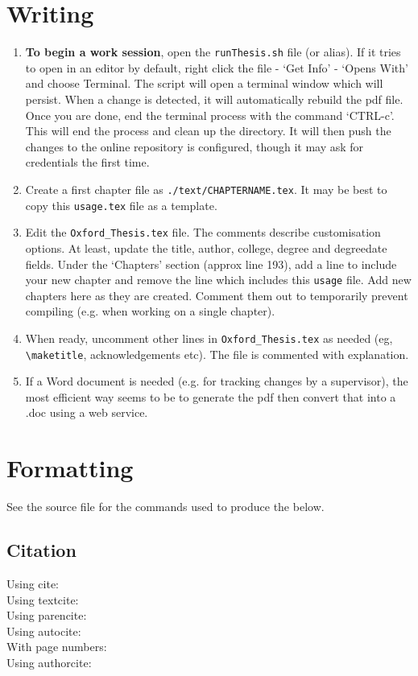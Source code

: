 \section{Writing}
\begin{enumerate}
  \item \textbf{To begin a work session}, open the \verb|runThesis.sh| file (or alias). If it tries to open in an editor by default, right click the file - `Get Info' - `Opens With' and choose Terminal. The script will open a terminal window which will persist. When a change is detected, it will automatically rebuild the pdf file. Once you are done, end the terminal process with the command `CTRL-c'. This will end the process and clean up the directory. It will then push the changes to the online repository is configured, though it may ask for credentials the first time.
  \item Create a first chapter file as \verb|./text/CHAPTERNAME.tex|. It may be best to copy this \verb|usage.tex| file as a template.
  \item Edit the \verb|Oxford_Thesis.tex| file. The comments describe customisation options. At least, update the title, author, college, degree and degreedate fields. Under the `Chapters' section (approx line 193), add a line to include your new chapter and remove the line which includes this \verb|usage| file. Add new chapters here as they are created. Comment them out to temporarily prevent compiling (e.g. when working on a single chapter).
  \item When ready, uncomment other lines in \verb|Oxford_Thesis.tex| as needed (eg, \verb|\maketitle|, acknowledgements etc). The file is commented with explanation.
  \item If a Word document is needed (e.g. for tracking changes by a supervisor), the most efficient way seems to be to generate the pdf then convert that into a .doc using a web service.
\end{enumerate}

\section{Formatting}
See the source file for the commands used to produce the below.

\subsection{Citation}
Using cite: \cite{Palen2008a} \\
Using textcite: \textcite{Palen2008a} \\
Using parencite: \parencite{Palen2008a} \\
Using autocite: \autocite{Palen2008a} \\
With page numbers: \autocite[22-33]{Palen2008a} \\
Using authorcite: \citeauthor{Palen2008a}

